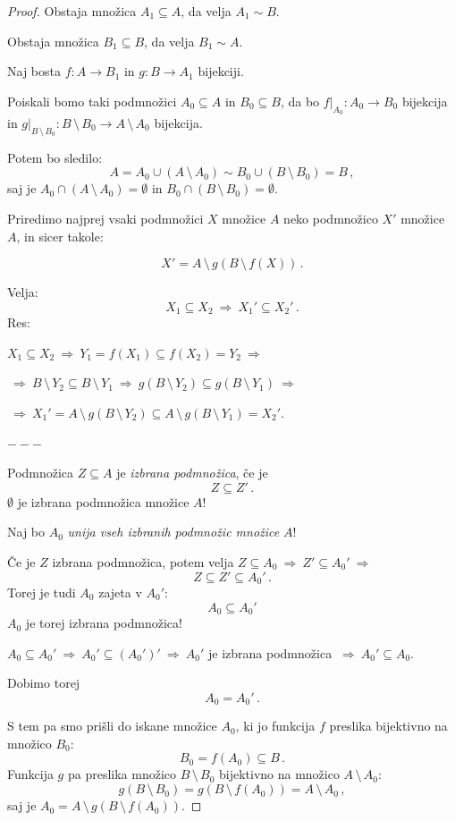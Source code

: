 \documentclass[11pt,paper=b5,DIV=13,headinclude,footinclude]{scrbook}
\def\sledi {{~\Rightarrow~}}
\def\brez {{\,\setminus\,}}
\def\cee {{~\Leftrightarrow~}}
\begin{document}
\begin{proof}
Obstaja množica $A_1\subseteq A$, da velja $A_1\sim B$.

Obstaja množica $B_1\subseteq B$, da velja $B_1\sim A$.

Naj bosta $f:A\to B_1$ in $g:B\to A_1$ bijekciji.

Poiskali bomo taki podmnožici $A_0\subseteq A$ in $B_0\subseteq B$, da bo
$f|_{A_0}:A_0\to B_0$ bijekcija in $g|_{B\brez B_0}:B\brez B_0\to A\brez A_0$ bijekcija.

Potem bo sledilo:
$$A = A_0\cup (A\brez A_0)\sim B_0\cup (B\brez B_0)= B\,,$$
saj je $A_0\cap (A\brez A_0) = \emptyset$ in
 $B_0\cap (B\brez B_0) = \emptyset$.

 \medskip
Priredimo najprej vsaki podmnožici $X$ množice $A$ neko podmnožico $X'$
množice $A$, in sicer takole:

%
$$X' = A\brez g(B\brez f(X))\,.$$

%
\medskip
Velja:
$$X_1\subseteq X_2\sledi X_1'\subseteq X_2'\,.$$
Res:

$X_1\subseteq X_2
\sledi
Y_1 = f(X_1)\subseteq f(X_2) = Y_2\sledi$

$\sledi B\brez Y_2\subseteq B\brez Y_1\sledi g(B\brez Y_2)\subseteq g(B\brez Y_1)\sledi$

$\sledi X_1' = A\brez g(B\brez Y_2)\subseteq A\brez g(B\brez Y_1)= X_2'$.

$---$

Podmnožica $Z\subseteq A$ je {\em izbrana podmnožica}, če je
$$Z\subseteq Z'\,.$$
$\emptyset$ je izbrana podmnožica množice $A$!

Naj bo $A_0$ {\em unija vseh izbranih podmnožic množice} $A$!

Če je $Z$ izbrana podmnožica, potem velja $Z\subseteq A_0\sledi Z'\subseteq A_0'\sledi$
$$Z\subseteq Z'\subseteq A_0'\,.$$
Torej je tudi $A_0$ zajeta v $A_0'$:
$$A_0\subseteq A_0'$$
$A_0$ je torej izbrana podmnožica!

$A_0\subseteq A_0' \sledi A_0'\subseteq (A_0')'\sledi
A_0'$ je izbrana podmnožica $\sledi A_0'\subseteq A_0$.

Dobimo torej $$A_0 = A_0'\,.$$

S tem pa smo prišli do iskane množice $A_0$, ki jo funkcija $f$ preslika bijektivno na množico
$B_0$:
$$B_0 = f(A_0)\subseteq B\,.$$
Funkcija $g$ pa preslika množico $B\brez B_0$ bijektivno na množico $A\brez A_0$:
$$g(B\brez B_0) = g(B\brez f(A_0)) = A\brez A_0\,,$$
saj je $A_0 = A\brez g(B\brez f(A_0))$.
\end{proof}
\end{document}
